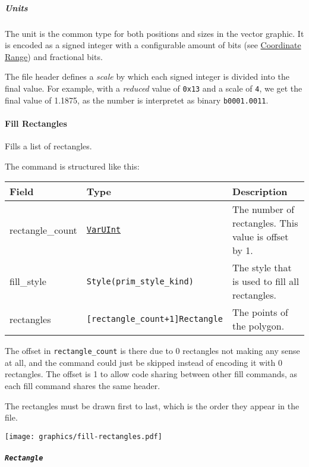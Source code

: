 \documentclass[]{article}
\begin{document}
\hypertarget{units}{\subparagraph{Units}\label{units}}

The unit is the common type for both positions and sizes in the vector
graphic. It is encoded as a signed integer with a configurable amount of
bits (see \protect\hyperlink{coordinate-range}{Coordinate Range}) and
fractional bits.

The file header defines a \emph{scale} by which each signed integer is
divided into the final value. For example, with a \emph{reduced} value
of \texttt{0x13} and a scale of \texttt{4}, we get the final value of
1.1875, as the number is interpretet as binary \texttt{b0001.0011}.

\hypertarget{fill-rectangles}{\paragraph{Fill Rectangles}\label{fill-rectangles}}

Fills a list of rectangles.

The command is structured like this:

\begin{longtable}[]{@{}p{1in}p{2in}p{3in}@{}}
\toprule
Field & Type & Description \\
\midrule
\endhead
rectangle\_count & \protect\hyperlink{varuint}{\texttt{VarUInt}} & The number of rectangles. This value is offset by 1. \\
fill\_style & \texttt{Style(prim\_style\_kind)} & The style that is used to fill all rectangles. \\
rectangles & \texttt{{[}rectangle\_count+1{]}Rectangle} & The points of the polygon. \\
\bottomrule
\end{longtable}

The offset in \texttt{rectangle\_count} is there due to 0 rectangles not
making any sense at all, and the command could just be skipped instead of
encoding it with 0 rectangles. The offset is 1 to allow code sharing
between other fill commands, as each fill command shares the same
header.

The rectangles must be drawn first to last, which is the order they appear
in the file.

\begin{center}
  \texttt{[image: graphics/fill-rectangles.pdf]}
\end{center}

\hypertarget{rectangle}{\subparagraph{\texorpdfstring{\texttt{Rectangle}}{Rectangle}}\label{rectangle}}
\end{document}
